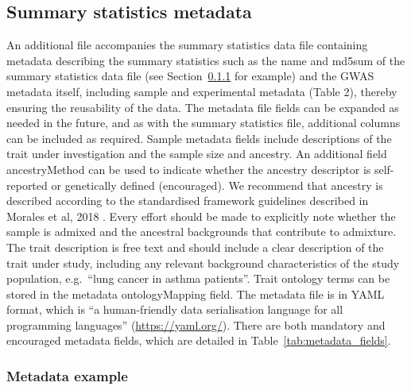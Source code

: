 \documentclass[11pt]{article}
\begin{document}
\subsection{Summary statistics metadata}
An additional file accompanies the summary statistics data file containing metadata describing the summary statistics such as the name and md5sum of the summary statistics data file (see Section~\ref{metadata_example} for example) and the GWAS metadata itself, including sample and experimental metadata (Table 2),  thereby ensuring the reusability of the data. The metadata file fields can be expanded as needed in the future, and as with the summary statistics file, additional columns can be included as required. Sample metadata fields include descriptions of the trait under investigation and the sample size and ancestry. An additional field ancestryMethod can be used to indicate whether the ancestry descriptor is self-reported or genetically defined (encouraged). We recommend that ancestry is described according to the standardised framework guidelines described in Morales et al, 2018 \cite{PMID:29448949}. Every effort should be made to explicitly note whether the sample is admixed and the ancestral backgrounds that contribute to admixture. The trait description is free text and should include a clear description of the trait under study, including any relevant background characteristics of the study population, e.g.\ ``lung cancer in asthma patients''. Trait ontology terms can be stored in the metadata ontologyMapping field. The metadata file is in YAML format, which is ``a human-friendly data serialisation language for all programming languages'' (\url{https://yaml.org/}). There are both mandatory and encouraged metadata fields, which are detailed in Table~\ref{tab:metadata_fields}. 


\subsubsection{Metadata example} \label{metadata_example}


\end{document}
